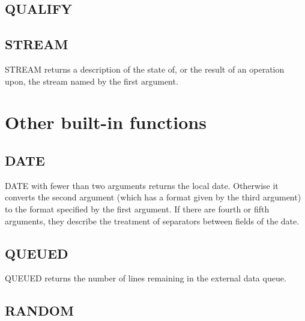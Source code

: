 

\subsection{QUALIFY}\label{qualify}



\subsection{STREAM}\label{stream}

STREAM returns a description of the state of, or the result of an
operation upon, the stream named by the first argument.



\section{Other built-in functions}\label{other-built-in-functions}

\subsection{DATE}\label{date}

DATE with fewer than two arguments returns the local date. Otherwise it
converts the second argument (which has a format given by the third
argument) to the format specified by the first argument. If there are
fourth or fifth arguments, they describe the treatment of separators
between fields of the date.



\subsection{QUEUED}\label{queued}

QUEUED returns the number of lines remaining in the external data queue.



\subsection{RANDOM}\label{random}

